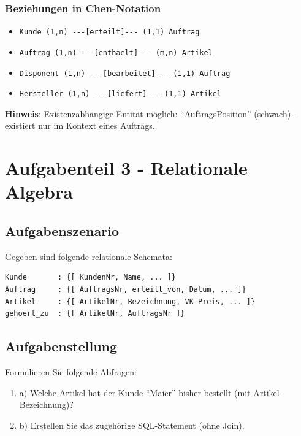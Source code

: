 \documentclass[a4paper]{article}
\begin{document}
\subsubsection{Beziehungen in Chen-Notation}

\begin{itemize}
    \item \lstinline|Kunde (1,n) ---[erteilt]--- (1,1) Auftrag|
    \item \lstinline|Auftrag (1,n) ---[enthaelt]--- (m,n) Artikel|
    \item \lstinline|Disponent (1,n) ---[bearbeitet]--- (1,1) Auftrag|
    \item \lstinline|Hersteller (1,n) ---[liefert]--- (1,1) Artikel|
\end{itemize}

\textbf{Hinweis}: Existenzabhängige Entität möglich: ``AuftragsPosition'' (schwach) - 
existiert nur im Kontext eines Auftrags.

\newpage

\section{Aufgabenteil 3 - Relationale Algebra}

\subsection{Aufgabenszenario}

Gegeben sind folgende relationale Schemata:

\begin{lstlisting}
Kunde       : {[ KundenNr, Name, ... ]}
Auftrag     : {[ AuftragsNr, erteilt_von, Datum, ... ]}
Artikel     : {[ ArtikelNr, Bezeichnung, VK-Preis, ... ]}
gehoert_zu  : {[ ArtikelNr, AuftragsNr ]}
\end{lstlisting}

\subsection{Aufgabenstellung}

Formulieren Sie folgende Abfragen:

\begin{enumerate}
    \item a) Welche Artikel hat der Kunde ``Maier'' bisher bestellt (mit Artikel-Bezeichnung)?
    \item b) Erstellen Sie das zugehörige SQL-Statement (ohne Join).
\end{enumerate}
\end{document}
